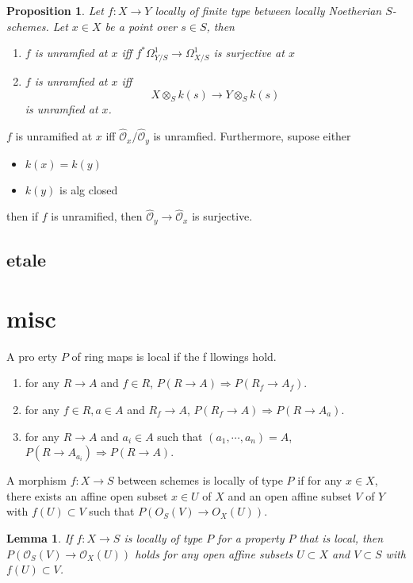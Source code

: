 \documentclass[leqno]{amsart}
\newcommand{\oo}{\mathcal O}
\newcommand{\1}{\mathbf{1}}
\newtheorem{lem}[thm]{Lemma}
\newtheorem{prop}[thm]{Proposition}
\theoremstyle{definition}
\theoremstyle{remark}
\begin{document}
\begin{prop}
	Let $f\colon X\to Y$ locally of finite type
	between locally Noetherian  $S$-schemes.
	Let  $x\in X$ be a point over  $s\in S$, then
	 \begin{enumerate}[label=(\alph*)]
		\item $f$ is unramfied at $x$ iff
			$f^*\Omega^1_{Y/S}\to \Omega^1_{X/S}$
			is surjective at $x$
		\item  $f$ is unramfied at $x$ iff
			\[
				X\otimes_Sk(s)\to 
				Y\otimes_Sk(s)
			\]
			is unramfied at $x$.
	\end{enumerate}
\end{prop}

$f$ is unramified at $x$ iff
 $ \hat{\oo}_x/\hat{\oo}_y$ is unramfied.
 Furthermore, supose either
 \begin{itemize}
	 \item $k(x)=k(y)$
	 \item  $k(y)$ is alg closed
 \end{itemize}
 then if $f$ is unramified,
 then  $ \hat{\oo}_y\to \hat{\oo}_x$ is surjective.

\subsection{etale}


\section{misc}

A pro erty $P$ of ring maps is local if 
the f llowings hold.
\begin{enumerate}[label=(\alph*)]
	\item for any $R\to A$ and  $f\in R$,
		$P(R\to A)\Longrightarrow P(R_f\to A_f)$.
	\item for any  $f\in R, a\in A$ and  $R_f\to A$,
		$P(R_f\to A)\Longrightarrow P(R\to A_a)$.
	\item for any  $R\to A$ and  $a_i\in A$ 
		such that  $(a_1,\cdots,a_n)=A$,
		$P(R\to A_{a_i})\Longrightarrow P(R\to A)$.
\end{enumerate}
A morphism $f\colon X\to S$ between schemes 
is locally of type $P$ if for any  $x\in X$,
there exists an affine open subset  $x\in U$ of  $X$
and an open affine subset $V$ of $Y$ with  $f(U)\subset V$
such that $P(O_S(V)\to O_X(U))$.
\begin{lem}
	If $f\colon X\to S$ is locally of type  $P$
	for a property  $P$ that is local,
	then $P(\oo_S(V)\to \oo_X(U))$ holds
	for any open affine subsets 
	$U\subset X$ and  $V\subset S$
	with  $f(U)\subset V$.
\end{lem}

\end{document}
